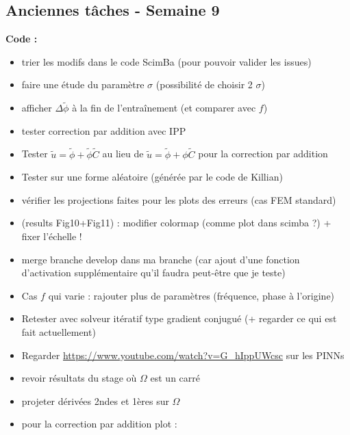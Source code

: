 \subsection*{Anciennes tâches - Semaine 9}

\textbf{Code :}
\begin{itemize}[label=$\square$] 
	\item[\previous{5}] trier les modifs dans le code ScimBa (pour pouvoir valider les issues)
	\item[\done] faire une étude du paramètre $\sigma$ (possibilité de choisir 2 $\sigma$) \textcolor{Green}{}
	\item[\previous{5}] afficher $\Delta \tilde{\phi}$ à la fin de l'entraînement (et comparer avec $f$)
	\item[\previous{5}] tester correction par addition avec IPP
	\item[\wontfix] Tester $\tilde{u}=\tilde{\phi}+\tilde{\phi}\tilde{C}$ au lieu de $\tilde{u}=\tilde{\phi}+\phi\tilde{C}$ pour la correction par addition \textcolor{Green}{}
	\item[\done] Tester sur une forme aléatoire (générée par le code de Killian) \textcolor{Green}{}
	\item[\previous{6}] vérifier les projections faites pour les plots des erreurs (cas FEM standard)
	\item[\previous{6}] (results Fig10+Fig11) : modifier colormap (comme plot dans scimba ?) + fixer l'échelle !
	\item[\previous{6}] merge branche develop dans ma branche (car ajout d'une fonction d'activation supplémentaire qu'il faudra peut-être que je teste)
	\item[\previous{6}] Cas $f$ qui varie : rajouter plus de paramètres (fréquence, phase à l'origine) 
	\item[\previous{6}] Retester avec solveur itératif type gradient conjugué (+ regarder ce qui est fait actuellement)
	\item[\previous{6}] Regarder \url{https://www.youtube.com/watch?v=G_hIppUWcsc} sur les PINNs
	\item[\previous{7}] revoir résultats du stage où $\Omega$ est un carré
	\item[\done] projeter dérivées 2ndes et 1ères sur $\Omega$ \textcolor{Green}{}
	\item[\previous{7}] pour la correction par addition plot : \\
	\begin{minipage}{0.48\linewidth}

\end{minipage}
\end{itemize}
